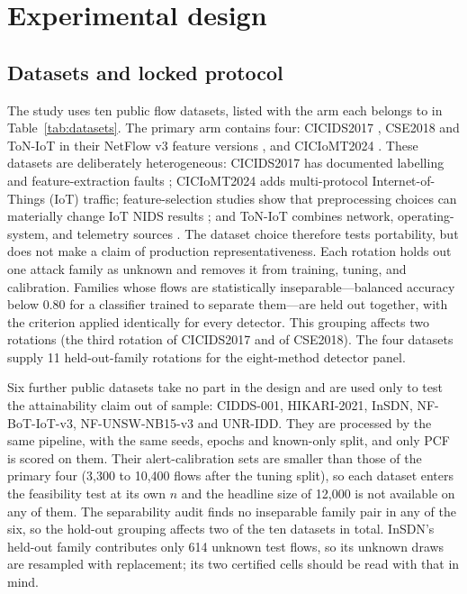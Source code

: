 \documentclass[a4paper,fleqn]{cas-dc}
\begin{document}
\section{Experimental design}
\label{sec:experiments}

\subsection{Datasets and locked protocol}
The study uses ten public flow datasets, listed with the arm each belongs to in Table~\ref{tab:datasets}. The primary arm contains four: CICIDS2017 \cite{sharafaldin2018cicids}, CSE2018 and ToN-IoT in their NetFlow v3 feature versions \cite{sarhan2022netflow,ton2021architecture}, and CICIoMT2024 \cite{ciciomt2024benchmark}. These datasets are deliberately heterogeneous: CICIDS2017 has documented labelling and feature-extraction faults \cite{cicids2021case}; CICIoMT2024 adds multi-protocol Internet-of-Things (IoT) traffic; feature-selection studies show that preprocessing choices can materially change IoT NIDS results \cite{iot2024feature}; and ToN-IoT combines network, operating-system, and telemetry sources \cite{ton2021architecture,ton2020federated}. The dataset choice therefore tests portability, but does not make a claim of production representativeness. Each rotation holds out one attack family as unknown and removes it from training, tuning, and calibration. Families whose flows are statistically inseparable---balanced accuracy below 0.80 for a classifier trained to separate them---are held out together, with the criterion applied identically for every detector. This grouping affects two rotations (the third rotation of CICIDS2017 and of CSE2018). The four datasets supply 11 held-out-family rotations for the eight-method detector panel.

Six further public datasets take no part in the design and are used only to test the attainability claim out of sample: CIDDS-001, HIKARI-2021, InSDN, NF-BoT-IoT-v3, NF-UNSW-NB15-v3 and UNR-IDD. They are processed by the same pipeline, with the same seeds, epochs and known-only split, and only PCF is scored on them. Their alert-calibration sets are smaller than those of the primary four (3,300 to 10,400 flows after the tuning split), so each dataset enters the feasibility test at its own $n$ and the headline size of 12,000 is not available on any of them. The separability audit finds no inseparable family pair in any of the six, so the hold-out grouping affects two of the ten datasets in total. InSDN's held-out family contributes only 614 unknown test flows, so its unknown draws are resampled with replacement; its two certified cells should be read with that in mind.
\end{document}
